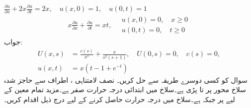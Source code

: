 \quad
$\frac{\partial u}{\partial x}+2x\frac{\partial u}{\partial t}=2x,\quad u(x,0)=1,\quad u(0,t)=1$
\quad
\begin{align*}
x\frac{\partial u}{\partial x}+\frac{\partial u}{\partial t}=xt,\quad \substack{u(x,0)=0,\quad x\ge 0\\ u(0,t)=0,\quad t\ge 0}
\end{align*}
جواب:\quad
\begin{align*}
U(x,s)&=\tfrac{c(s)}{x^s}+\tfrac{x}{s^2(s+1)},\quad U(0,s)=0,\quad c(s)=0,\\
u(x,t)&=x(t-1+e^{-t})
\end{align*}
\quad سوال  کو کسی دوسرے طریقہ سے حل کریں۔
نصف لامتناہی ، اطراف سے حاجز شدہ سلاخ محور  پر  تا  پڑی ہے۔سلاخ میں ابتدائی درجہ حرارت صفر ہے۔مزید تمام معین   کے لیے  پر  جبکہ  ہے۔سلاخ میں درجہ حرارت  حاصل کرنے کے لیے درج ذیل اقدام کریں۔

